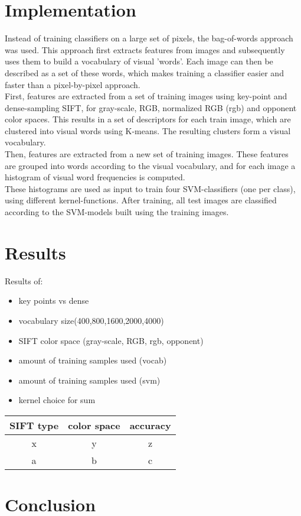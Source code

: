 \documentclass[12pt,a4paper]{article}
\begin{document}
\section{Implementation}
Instead of training classifiers on a large set of pixels, the bag-of-words approach was used. This approach first extracts features from images and subsequently uses them to build a vocabulary of visual 'words'. Each image can then be described as a set of these words, which makes training a classifier easier and faster than a pixel-by-pixel approach. \\
First, features are extracted from a set of training images using key-point and dense-sampling SIFT, for gray-scale, RGB, normalized RGB (rgb) and opponent color spaces. This results in a set of descriptors for each train image, which are clustered into visual words using K-means. The resulting clusters form a visual vocabulary. \\
Then, features are extracted from a new set of training images. These features are grouped into words according to the visual vocabulary, and for each image a histogram of visual word frequencies is computed.\\
These histograms are used as input to train four SVM-classifiers (one per class), using different kernel-functions. After training, all test images are classified according to the SVM-models built using the training images.
\section{Results}
Results of:\\
\begin{itemize}
\item key points vs dense
\item vocabulary size(400,800,1600,2000,4000)
\item SIFT color space (gray-scale, RGB, rgb, opponent)
\item amount of training samples used (vocab)
\item amount of training samples used (svm)
\item kernel choice for sum
\end{itemize}
\begin{tabular}{|c|c|c|}
\hline
SIFT type & color space & accuracy \\
\hline
x & y & z\\
a & b & c\\
\hline
\end{tabular}
\section{Conclusion}
\end{document}
